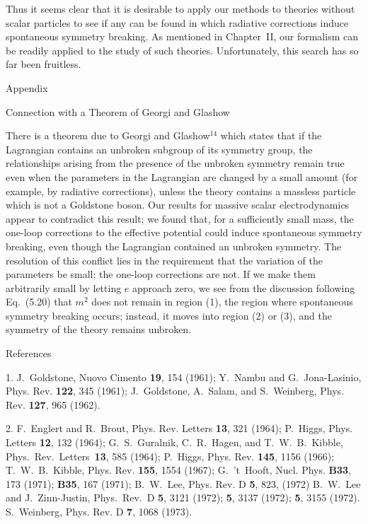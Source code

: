 \documentclass[12pt,epsf]{report}
\begin{document}
Thus it seems clear that it is desirable to apply our methods to
theories without scalar particles to see if any can be found in which
radiative corrections induce spontaneous symmetry breaking.  As
mentioned in Chapter~II, our formalism can be readily applied to the
study of such theories.  Unfortunately, this search has so far been
fruitless.



\vfill\eject 

\centerline{Appendix}
\centerline{Connection with a Theorem of Georgi and Glashow}

\bigskip

There is a theorem due to Georgi and Glashow$^{14}$ which states that
if the Lagrangian contains an unbroken subgroup of its symmetry group,
the relationships arising from the presence of the unbroken symmetry
remain true even when the parameters in the Lagrangian are changed by
a small amount (for example, by radiative corrections), unless the
theory contains a massless particle which is not a Goldstone boson.
Our results for massive scalar electrodynamics appear to contradict
this result; we found that, for a sufficiently small mass, the
one-loop corrections to the effective potential could induce
spontaneous symmetry breaking, even though the Lagrangian contained an
unbroken symmetry.  The resolution of this conflict lies in the
requirement that the variation of the parameters be small; the
one-loop corrections are not.  If we make them arbitrarily small by
letting $e$ approach zero, we see from the discussion following
Eq.~(5.20) that $m^2$ does not remain in region (1), the region where
spontaneous symmetry breaking occurs; instead, it moves into region
(2) or (3), and the symmetry of the theory remains unbroken.


\vfill \eject

\centerline{References}

\bigskip


\parindent=0pt
\def\bk{\hfill\break\phantom{1.~}}

1. J.~Goldstone, Nuovo Cimento {\bf 19}, 154 (1961); \bk
   Y.~Nambu and G.~Jona-Lasinio, Phys. Rev. {\bf 122}, 345 (1961);\bk
   J.~Goldstone, A.~Salam, and S.~Weinberg, Phys. Rev. {\bf 127},
   965 (1962).

\smallskip
\smallskip

2. F.~Englert and R.~Brout, Phys. Rev. Letters {\bf 13}, 321 (1964);
\bk   P.~Higgs, Phys. Letters {\bf 12}, 132 (1964); 
\bk   G.~S.~Guralnik, C.~R.~Hagen, and T.~W.~B.~Kibble, Phys.~Rev.~Letters~{\bf 13},
 585 (1964);
\bk   P.~Higgs, Phys. Rev. {\bf 145}, 1156 (1966); 
\bk   T.~W.~B.~Kibble, Phys. Rev. {\bf 155}, 1554 (1967);
\bk   G.~'t~Hooft, Nucl. Phys. {\bf B33}, 173 (1971); {\bf B35}, 167 (1971);
\bk   B.~W.~Lee, Phys. Rev. D {\bf 5}, 823, (1972)
\bk   B.~W.~Lee and J.~Zinn-Justin, Phys.~Rev.~D {\bf 5}, 3121 (1972);
{\bf 5}, 3137 (1972); {\bf 5}, 3155 (1972).
\bk   S.~Weinberg, Phys. Rev. D {\bf 7}, 1068 (1973).
\end{document}
